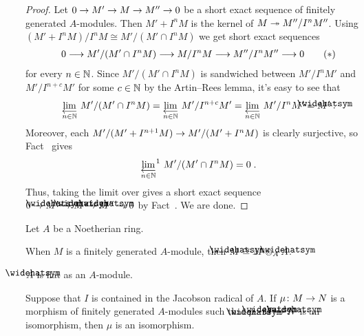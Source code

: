 \documentclass[a4paper,parskip=half,numbers=enddot, DIV=12]{scrreprt}
\begin{document}
\begin{proof}
	Let $0\morphism M'\morphism M\morphism M''\morphism 0$ be a short exact sequence of finitely generated $A$-modules. Then $M'+I^nM$ is the kernel of $M\epimorphism M''/I^nM''$. Using $(M'+I^nM)/I^nM\cong M'/(M'\cap I^nM)$ we get short exact sequences
	\begin{align}\lbl{eq:completion}
		0\morphism M'/(M'\cap I^nM)\morphism M/I^nM\morphism M''/I^nM''\morphism 0\tag{$*$}
	\end{align}
	for every $n\in\mathbb{N}$. Since $M'/(M'\cap I^nM)$ is sandwiched between $M'/I^nM'$ and $M'/I^{n+c}M'$ for some $c\in\mathbb{N}$ by the Artin--Rees lemma, it's easy to see that 
	\begin{align*}
		\limit[n\in \IN] M'/(M'\cap I^nM)=\limit[n\in\IN]M'/I^{n+c}M'=\limit[n\in\IN]M'/I^nM'=\roof{M}'\;. 
	\end{align*}
	Moreover, each $M'/(M'+I^{n+1}M)\morphism M'/(M'+I^nM)$ is clearly surjective, so Fact~ gives 
	\begin{align*}
		\limit[n\in\IN][^1]M'/(M'\cap I^nM)=0\;.
	\end{align*}
	Thus, taking the limit over  gives a short exact sequence $0\morphism \roof{M}'\morphism \roof{M}\morphism\roof{M}''\morphism 0$ by Fact~. We are done.
\end{proof}
\begin{cor}
	Let $A$ be a Noetherian ring.
	\begin{alphanumerate}
		\item When $M$ is a finitely generated $A$-module, then $\roof{M}\cong M\otimes_A\roof{A}$.
		\item $\roof{A}$ is flat as an $A$-module.
		\item Suppose that $I$ is contained in the Jacobson radical of $A$. If $\mu\colon M\morphism N$ is a morphism of finitely generated $A$-modules such that $\roof{\mu}\colon \roof{M}\morphism\roof{N}$ is an isomorphism, then $\mu$ is an isomorphism.
	\end{alphanumerate}
\end{cor}
\end{document}
